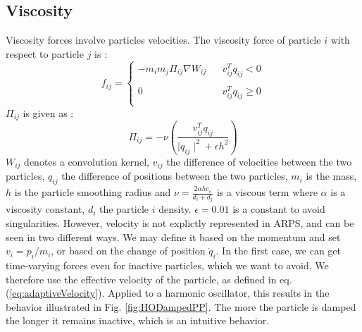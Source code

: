 \subsection{Viscosity}
Viscosity forces involve particles velocities. The viscosity force of particle $i$ with respect to particle $j$ is :
\begin{equation}
	\label{eq:viscosityForces}
	f_{ij} =
	\left\lbrace	
	\begin{array}{lrr}
	-m_{i}m_{j}\Pi_{ij}\nabla W_{ij} & & v_{ij}^{T}q_{ij}<0\\
	& & \\
	0 & & v_{ij}^{T}q_{ij} \geq 0 \\
	\end{array}		
	\right.
\end{equation}
$\Pi_{ij}$ is given as :
\begin{equation}
\label{eq:pij}
	\Pi_{ij} = -\nu\left( \frac{v_{ij}^{T}q_{ij}}{ \mid q_{ij} \mid^{2} + \epsilon h^{2} } \right)
\end{equation}
$W_{ij}$ denotes a convolution kernel, $v_{ij}$ the difference of velocities between the two particles, $q_{ij}$ the difference of positions between the two particles, $m_{i}$ is the mass, $h$ is the particle smoothing radius and $\nu = \frac{2 \alpha h c_{s}}{ d_{i} + d_{j} }$ is a viscous term where $\alpha$ is a viscosity constant,
$d_{i}$ the particle $i$ density.
$\epsilon=0.01$ is a constant to avoid singularities.
\newline \newline
However, velocity is not explictly represented in ARPS, and can be seen in two different ways. We may define it based on the momentum and set $ v_{i} = p_{i} / m_{i} $, or based on the change of position $  \dot{q}_{i}$.
In the first case, we can get time-varying forces even for inactive particles, which we want to avoid.
We therefore use the effective velocity of the particle, as defined in eq.(\ref{eq:adaptiveVelocity}).
Applied to a harmonic oscillator, this results in the behavior illustrated in Fig. \ref{fig:HODampedPP}.
The more the particle is damped the longer it remains inactive, which is an intuitive behavior.
